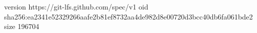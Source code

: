 version https://git-lfs.github.com/spec/v1
oid sha256:ea2341e52329266aafe2b81ef8732aa4de982d8e00720d3bcc40db6fa061bde2
size 196704
